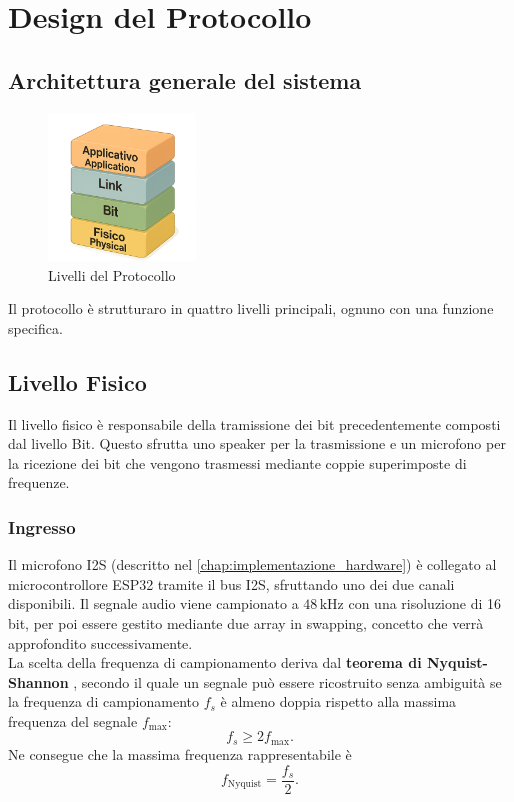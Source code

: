 \chapter{Design del Protocollo}
\label{chap:design_protocollo}
\section{Architettura generale del sistema}
\begin{figure}[H]
    \centering
    \includegraphics[width=0.35\textwidth]{immagini/layers.png}
    \caption{Livelli del Protocollo}
    \label{fig:layers}
\end{figure}
Il protocollo è strutturaro in quattro livelli principali, ognuno con una funzione specifica.
\section{Livello Fisico}
\label{sec:livello_fisico}
Il livello fisico è responsabile della tramissione dei bit precedentemente composti dal livello Bit.
Questo sfrutta uno speaker per la trasmissione e un microfono per la ricezione dei bit che vengono trasmessi mediante coppie superimposte di frequenze.
\subsection{Ingresso}
\label{sec:ingresso_livello_fisico}
Il microfono I2S (descritto nel \autoref{chap:implementazione_hardware}) è collegato al microcontrollore ESP32 tramite il bus I2S, sfruttando uno dei due canali disponibili.  
Il segnale audio viene campionato a $48\,\text{kHz}$ con una risoluzione di 16 bit, per poi essere gestito mediante due array in swapping, concetto che verrà approfondito successivamente. \\

\noindent
La scelta della frequenza di campionamento deriva dal \textbf{teorema di Nyquist-Shannon} \citep{shannon1949}, secondo il quale un segnale può essere ricostruito senza ambiguità se la frequenza di campionamento $f_s$ è almeno doppia rispetto alla massima frequenza del segnale $f_{\max}$:
\[
f_s \geq 2 f_{\max}.
\]
Ne consegue che la massima frequenza rappresentabile è
\[
f_{\text{Nyquist}} = \frac{f_s}{2}.
\]

